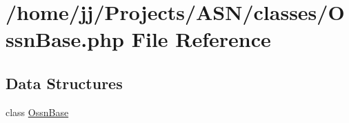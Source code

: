 \hypertarget{_ossn_base_8php}{}\section{/home/jj/\+Projects/\+A\+S\+N/classes/\+Ossn\+Base.php File Reference}
\label{_ossn_base_8php}
\subsection*{Data Structures}
\begin{DoxyCompactItemize}
\item 
class \hyperlink{class_ossn_base}{Ossn\+Base}
\end{DoxyCompactItemize}
